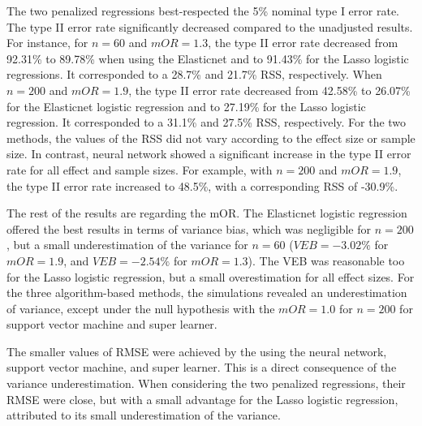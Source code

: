 \documentclass{article}
\begin{document}

The two penalized regressions best-respected the 5\% nominal type I error rate. The type II error rate significantly decreased compared to the unadjusted results.  For instance,  for $n=60$ and $mOR = 1.3$,  the type II error rate decreased from 92.31\%  to 89.78\% when using the Elasticnet and to 91.43\% for the Lasso logistic regressions.  It corresponded to a 28.7\% and 21.7\% RSS, respectively. When $n=200$ and $mOR = 1.9$, the type II error rate decreased from 42.58\%  to 26.07\% for the Elasticnet  logistic regression  and to 27.19\% for the Lasso logistic regression. It corresponded to a 31.1\% and 27.5\% RSS, respectively. For the two methods, the values of the RSS did not vary according to the effect size or sample size. In contrast, neural network showed a significant increase in the type II error rate for all effect and sample sizes. For example, with $n=200$ and $mOR = 1.9$, the type II error rate increased to 48.5\%, with a corresponding RSS of -30.9\%.

The rest of the results are regarding the mOR.  The Elasticnet logistic regression offered the best results in terms of variance bias, which was negligible for $n=200$,  but a small underestimation of the variance for $n=60$  ($VEB = -3.02\%$ for $mOR = 1.9$,  and $VEB = -2.54\%$ for $mOR = 1.3$).  The VEB was reasonable too for the Lasso logistic regression,  but a small overestimation for all effect sizes.  For the three algorithm-based methods,   the simulations revealed an underestimation of variance, except under the null hypothesis with the $mOR=1.0$ for $n=200$ for support vector machine and super learner.

The smaller values of RMSE were achieved by the using the neural network, support vector machine,  and super learner. This is a direct consequence of the variance underestimation.  When considering the two penalized regressions,  their RMSE were  close,  but with a small advantage for the Lasso logistic regression, attributed to its small underestimation of the variance.
\end{document}
